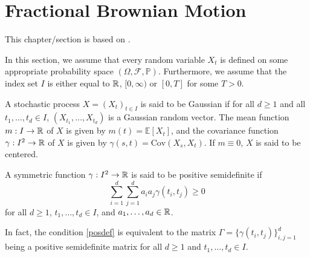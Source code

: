 \chapter{Fractional Brownian Motion}
This chapter/section is based on \cite{fBMbook}.

In this section, we assume that every random variable $X_{t}$ is defined on some appropriate probability space $(\Omega, \mathcal{F},\mathbb{P})$. Furthermore, we assume that the index set $I$ is either equal to $\mathbb{R}$, $[0,\infty)$ or $[0,T]$ for some $T>0$. 
\begin{defn}
    A stochastic process $X=(X_{t})_{t\in I}$ is said to be Gaussian if for all $d\geq 1$ and all $t_{1},\dots,t_{d}\in I$, $(X_{t_{1}},\dots,X_{t_{d}})$ is a Gaussian random vector. The mean function $m: I\to \mathbb{R}$ of $X$ is given by $m(t)=\mathbb{E}[X_{t}]$, and the covariance function $\gamma: I^{2}\to\mathbb{R}$ of $X$ is given by $\gamma(s,t)=\textrm{Cov}(X_{s},X_{t})$. If $m\equiv 0$, $X $ is said to be centered.
\end{defn}

\begin{defn}
    A symmetric function $\gamma: I^{2}\to \mathbb{R}$ is said to be positive semidefinite if
    \begin{equation}\label{posdef}
        \sum_{i=1}^{d}\sum_{j=1}^{d}a_{i}a_{j}\gamma(t_{i},t_{j})\geq 0
    \end{equation}
    for all $d\geq 1$, $t_{1},\dots,t_{d}\in I$, and $a_{1},\dots,a_{d}\in\mathbb{R}$.
\end{defn}
In fact, the condition \eqref{posdef} is equivalent to the matrix $\Gamma=\big\{\gamma (t_{i},t_{j})\big\}_{i,j=1}^{d}$ being a positive semidefinite matrix for all $d\geq 1$ and $t_{1},\dots,t_{d}\in I$.

